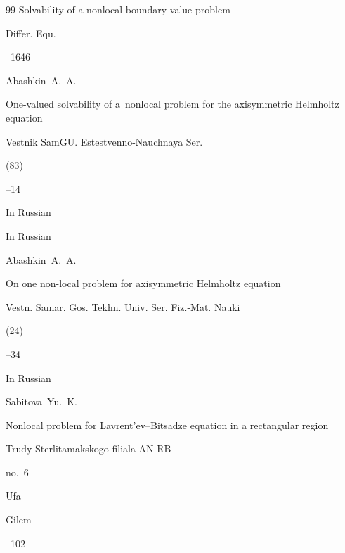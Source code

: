 \begin{thebibliography}{99}
\paper Solvability of a nonlocal boundary value problem

\jour Differ. Equ.



--1646 







\by Abashkin~A.~A.

\paper One-valued solvability of a~nonlocal problem for the axisymmetric Helmholtz equation

\jour Vestnik SamGU. Estestvenno-Nauchnaya Ser.


(83)

--14

\lang In Russian




\lang In Russian

\by Abashkin~A.~A.

\paper On one non-local problem for axisymmetric Helmholtz equation

\jour Vestn. Samar. Gos. Tekhn. Univ. Ser. Fiz.-Mat. Nauki


(24)

--34











\lang In Russian

\by Sabitova~Yu.~K.

\paper Nonlocal problem for Lavrent'ev--Bitsadze equation in a rectangular region

\inbook Trudy Sterlitamakskogo filiala AN RB

\volinfo no.~6

\publaddr Ufa

\publ Gilem


--102








\end{thebibliography}

